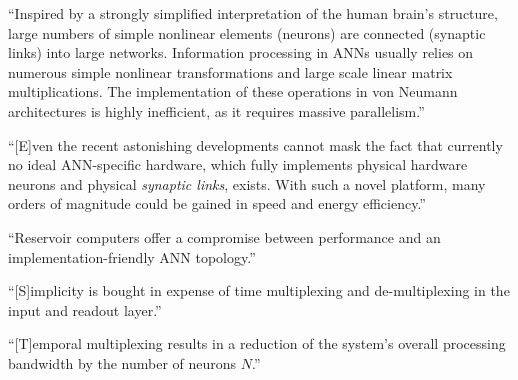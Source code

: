 \vspace{3em}
\cite{brpe2018}
``Inspired by a strongly simplified interpretation of the human brain's structure, large numbers of simple nonlinear elements (neurons) are connected (synaptic links) into large networks. Information processing in ANNs usually relies on numerous simple nonlinear transformations and large scale linear matrix multiplications. The implementation of these operations in von Neumann architectures is highly inefficient, as it requires massive parallelism.''

``[E]ven the recent astonishing developments cannot mask the fact that currently no ideal ANN-specific hardware, which fully implements physical hardware neurons and physical \textit{synaptic links}, exists. With such a novel platform, many orders of magnitude could be gained in speed and energy efficiency.''

``Reservoir computers offer a compromise between performance and an implementation-friendly ANN topology.''

``[S]implicity is bought in expense of time multiplexing and de-multiplexing in the input and readout layer.'' 

``[T]emporal multiplexing results in a reduction of the system's overall processing bandwidth by the number of neurons $N$.''

